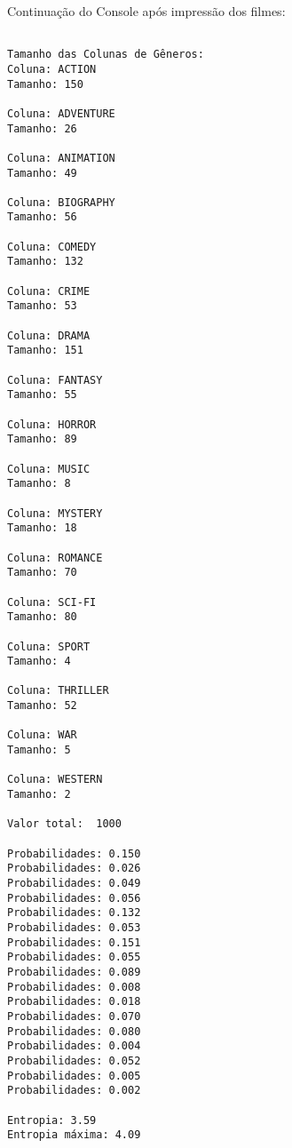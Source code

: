 \documentclass{article}
\begin{document}
Continuação do Console após impressão dos filmes:

\begin{verbatim}

Tamanho das Colunas de Gêneros:
Coluna: ACTION
Tamanho: 150

Coluna: ADVENTURE
Tamanho: 26

Coluna: ANIMATION
Tamanho: 49

Coluna: BIOGRAPHY 
Tamanho: 56

Coluna: COMEDY
Tamanho: 132

Coluna: CRIME
Tamanho: 53

Coluna: DRAMA 
Tamanho: 151

Coluna: FANTASY 
Tamanho: 55

Coluna: HORROR 
Tamanho: 89

Coluna: MUSIC
Tamanho: 8

Coluna: MYSTERY 
Tamanho: 18

Coluna: ROMANCE 
Tamanho: 70

Coluna: SCI-FI
Tamanho: 80

Coluna: SPORT 
Tamanho: 4

Coluna: THRILLER 
Tamanho: 52

Coluna: WAR
Tamanho: 5

Coluna: WESTERN
Tamanho: 2

Valor total:  1000

Probabilidades: 0.150
Probabilidades: 0.026
Probabilidades: 0.049
Probabilidades: 0.056
Probabilidades: 0.132
Probabilidades: 0.053
Probabilidades: 0.151
Probabilidades: 0.055
Probabilidades: 0.089
Probabilidades: 0.008
Probabilidades: 0.018
Probabilidades: 0.070
Probabilidades: 0.080
Probabilidades: 0.004
Probabilidades: 0.052
Probabilidades: 0.005
Probabilidades: 0.002

Entropia: 3.59
Entropia máxima: 4.09 

\end{verbatim}
\end{document}
